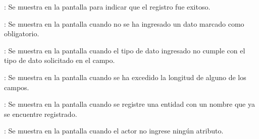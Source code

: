 \begin{Citemize}
	\item {}: Se muestra en la pantalla  para indicar que el registro fue exitoso.
	\item {}: Se muestra en la pantalla  cuando no se ha ingresado un dato marcado como obligatorio.
	\item {}: Se muestra en la pantalla  cuando el tipo de dato ingresado no cumple con el tipo de dato solicitado en el campo.
	\item {}: Se muestra en la pantalla  cuando se ha excedido la longitud de alguno de los campos.
	\item {}: Se muestra en la pantalla  cuando se registre una entidad con un nombre que ya se encuentre registrado.
	\item {}: Se muestra en la pantalla  cuando el actor no ingrese ningún atributo.
\end{Citemize}
